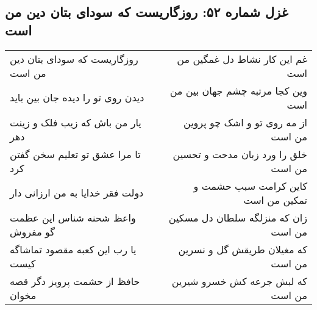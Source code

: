 \begin{center}
\section*{غزل شماره ۵۲: روزگاریست که سودای بتان دین من است}
\label{sec:sh052}
\begin{longtable}{l p{0.5cm} r}
روزگاریست که سودای بتان دین من است
&&
غم این کار نشاط دل غمگین من است
\\
دیدن روی تو را دیده جان بین باید
&&
وین کجا مرتبه چشم جهان بین من است
\\
یار من باش که زیب فلک و زینت دهر
&&
از مه روی تو و اشک چو پروین من است
\\
تا مرا عشق تو تعلیم سخن گفتن کرد
&&
خلق را ورد زبان مدحت و تحسین من است
\\
دولت فقر خدایا به من ارزانی دار
&&
کاین کرامت سبب حشمت و تمکین من است
\\
واعظ شحنه شناس این عظمت گو مفروش
&&
زان که منزلگه سلطان دل مسکین من است
\\
یا رب این کعبه مقصود تماشاگه کیست
&&
که مغیلان طریقش گل و نسرین من است
\\
حافظ از حشمت پرویز دگر قصه مخوان
&&
که لبش جرعه کش خسرو شیرین من است
\\
\end{longtable}
\end{center}
